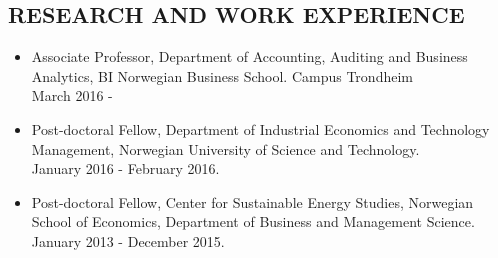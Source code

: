 \documentclass[margin]{res}
\begin{document}
\begin{resume}


\section{RESEARCH AND WORK EXPERIENCE}
                  \begin{itemize}
                  \setlength{\itemsep}{10pt}
                  \item[] Associate Professor, Department of Accounting, Auditing and Business Analytics, BI Norwegian Business School. Campus Trondheim \\ March 2016 -
                  \item[] Post-doctoral Fellow, Department of Industrial Economics and Technology Management, Norwegian University of Science and Technology. \\ January 2016 - February 2016.
                  \item[] Post-doctoral Fellow, Center for Sustainable Energy Studies, Norwegian School of Economics, Department of Business and Management Science. \\ January 2013 - December 2015.


\end{itemize}
\end{resume}
\end{document}
